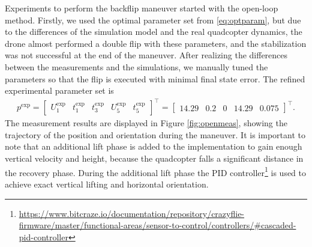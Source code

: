 Experiments to perform the backflip maneuver started with the open-loop method. Firstly, we used the optimal parameter set from \eqref{eq:optparam}, but due to the differences of the simulation model and the real quadcopter dynamics, the drone almost performed a double flip with these parameters, and the stabilization was not successful at the end of the maneuver. After realizing the differences between the measurements and the simulations, we manually tuned the parameters so that the flip is executed with minimal final state error. The refined experimental parameter set is
\begin{align*}
    p^\mathrm{exp} = \begin{bmatrix}
U_1^\mathrm{exp} & t_1^\mathrm{exp} & t_3^\mathrm{exp} & U_5^\mathrm{exp}& t_5^\mathrm{exp}
\end{bmatrix} ^\top =  \begin{bmatrix}
14.29 & 0.2 & 0 & 14.29 & 0.075
\end{bmatrix}^\top.
\end{align*}
The measurement results are displayed in Figure \ref{fig:openmeas}, showing the trajectory of the position and orientation during the maneuver. It is important to note that an additional lift phase is added to the implementation to gain enough vertical velocity and height, because the quadcopter falls a significant distance in the recovery phase. During the additional lift phase the PID controller\footnote{\url{https://www.bitcraze.io/documentation/repository/crazyflie-firmware/master/functional-areas/sensor-to-control/controllers/\#cascaded-pid-controller}} is used to achieve exact vertical lifting and horizontal orientation.


